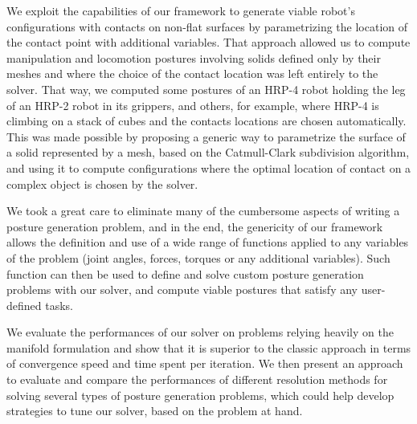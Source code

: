 We exploit the capabilities of our framework to generate viable robot's configurations with contacts on non-flat surfaces by parametrizing the location of the contact point with additional variables.
That approach allowed us to compute manipulation and locomotion postures involving solids defined only by their meshes and where the choice of the contact location was left entirely to the solver.
That way, we computed some postures of an HRP-4 robot holding the leg of an HRP-2 robot in its grippers, and others, for example, where HRP-4 is climbing on a stack of cubes and the contacts locations are chosen automatically.
This was made possible by proposing a generic way to parametrize the surface of a solid represented by a mesh, based on the Catmull-Clark subdivision algorithm, and using it to compute configurations where the optimal location of contact on a complex object is chosen by the solver.

We took a great care to eliminate many of the cumbersome aspects of writing a posture generation problem, and in the end, the genericity of our framework allows the definition and use of a wide range of functions applied to any variables of the problem (joint angles, forces, torques or any additional variables).
Such function can then be used to define and solve custom posture generation problems with our solver, and compute viable postures that satisfy any user-defined tasks.

We evaluate the performances of our solver on problems relying heavily on the manifold formulation and show that it is superior to the classic approach in terms of convergence speed and time spent per iteration.
We then present an approach to evaluate and compare the performances of different resolution methods for solving several types of posture generation problems, which could help develop strategies to tune our solver, based on the problem at hand.

